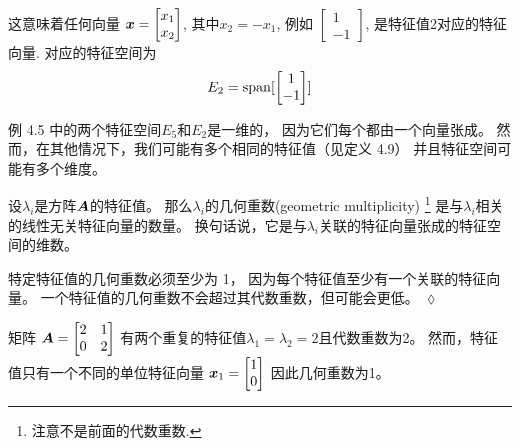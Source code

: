 \begin{example}
    这意味着任何向量
    $\boldsymbol{x} = \begin{bmatrix} x_1 \\ x_2 \end{bmatrix}$,
    其中$x_2 = -x_1$, 例如
    $\begin{bmatrix} 1 \\ -1 \end{bmatrix}$,
    是特征值2对应的特征向量.
    对应的特征空间为
    \begin{equation}
        E_2 = \mathrm{span}[\begin{bmatrix} 1 \\ -1 \end{bmatrix}]
    \end{equation}
\end{example}

例 4.5 中的两个特征空间$E_5$和$E_2$是一维的，
因为它们每个都由一个向量张成。
然而，在其他情况下，我们可能有多个相同的特征值（见定义 4.9）
并且特征空间可能有多个维度。

\begin{definition}
    设$\lambda_i$是方阵$\boldsymbol{A}$的特征值。
    那么$\lambda_i$的几何重数(geometric multiplicity)
    \footnote{注意不是前面的代数重数.}
    是与$\lambda_i$相关的线性无关特征向量的数量。
    换句话说，它是与$\lambda_i$关联的特征向量张成的特征空间的维数。
\end{definition}
\begin{remark}
    特定特征值的几何重数必须至少为 1，
    因为每个特征值至少有一个关联的特征向量。
    一个特征值的几何重数不会超过其代数重数，但可能会更低。
    \hfill $\lozenge$
\end{remark}

\begin{example}
    矩阵
    $\boldsymbol{A} =
    \begin{bmatrix}
        2 & 1 \\
        0 & 2
    \end{bmatrix}$
    有两个重复的特征值$\lambda_1 = \lambda_2 = 2$且代数重数为2。
    然而，特征值只有一个不同的单位特征向量
    $\boldsymbol{x}_1 = \begin{bmatrix} 1 \\ 0 \end{bmatrix}$
    因此几何重数为1。
\end{example}

